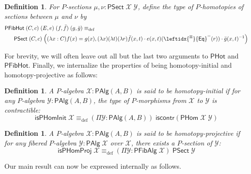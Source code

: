 \documentclass[reqno,10pt,a4paper,oneside]{amsart}
\numberwithin{equation}{section}
\theoremstyle{mythm}
\theoremstyle{mydef}
\newtheorem{definition}[theorem]{Definition}
\theoremstyle{myrmk}
\newcommand{\deq}{\equiv}
\newcommand{\defeq}{\deq_{\mathrm{def}}}
\newcommand{\iscontr}{\mathsf{iscontr}}
\newcommand{\ct}{\cdot}
\newcommand{\funext}{\leftidx{^\Pi}{\mathsf{Eq}}^{=}}
\newcommand{\WCell}{\mathsf{PHot}}
\newcommand{\WFibCell}{\mathsf{PFibHot}}
\newcommand{\WAlg}{\mathsf{PAlg}}
\newcommand{\WFibAlg}{\mathsf{PFibAlg}}
\newcommand{\WHom}{\mathsf{PHom}}
\newcommand{\WFibHom}{\mathsf{PSect}}
\newcommand{\IsWHInit}{\mathsf{isPHomInit}}
\newcommand{\IsWHProj}{\mathsf{isPHomProj}}
\newcommand{\X}{\mathcal{X}}
\newcommand{\Y}{\mathcal{Y}}
\begin{document}
\begin{definition}\label{def:WFibCell}
For $P$-sections $\mu, \nu : \WFibHom \; \X \; \Y$, define the type of \emph{$P$-homotopies of sections} between $\mu$ and $\nu$ by
\begin{align*}
& \WFibCell \; (C,c) \; (E, e) \; (f,\bar{f}) \; (g,\bar{g}) \defeq \\ & \;\;\; \;\;\;\WFibHom \; (C,c) \; \Big((\lambda x:C) f(x) = g(x), (\lambda x) (\lambda t) (\lambda r) \bar{f}(x,t) \ct e(x,t)(\funext(r)) \ct \bar{g}(x,t)^{-1}\Big)
\end{align*}
\end{definition}

For brevity, we will often leave out all but the last two arguments to $\WCell$ and $\WFibCell$. Finally, we internalize the properties of being homotopy-initial and homotopy-projective as follows:

\begin{definition}\label{def:WHInit}
A $P$-algebra $\X : \WAlg(A,B)$ is said to be \emph{homotopy-initial} if for any $P$-algebra $\Y : \WAlg(A,B)$, the type of $P$-morphisms from $\X$ to $\Y$ is contractible:
\[ \IsWHInit \; \X \defeq (\Pi \Y:\WAlg(A,B)) \; \iscontr(\WHom \; \X \; \Y) \]  
\end{definition}

\begin{definition}\label{def:WHProj}
A $P$-algebra $\X : \WAlg(A,B)$ is said to be \emph{homotopy-projective} if for any fibered $P$-algebra $\Y : \WAlg \; \X$ over $\X$, there exists a $P$-section of $\Y$:
\[ \IsWHProj \; \X \defeq (\Pi \Y:\WFibAlg \; \X) \; \WFibHom \; \Y \]  
\end{definition}

Our main result can now be expressed internally as follows.
\end{document}
